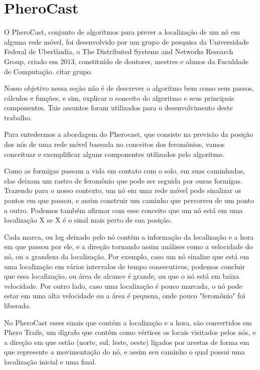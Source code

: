 \documentclass[12pt, %
openright, 
oneside,
a4paper,
brazil]{facom-ufu-abntex2}
\begin{document}
\section{PheroCast}

	O PheroCast, conjunto de algoritmos para prever a localização de um nó em alguma rede móvel, foi desenvolvido por um grupo de pesquisa da Universidade Federal de Uberlândia, o The Distributed Systems and Networks  Research Group, criado em 2013, constituído de doutores, mestres e alunos da Faculdade de Computação. citar grupo. 
	
	Nosso objetivo nessa seção não é de descrever o algoritmo bem como seus passos, cálculos e funções, e sim, explicar o conceito do algoritmo e seus principais componentes. Tais assuntos foram utilizados para o desenvolvimento deste trabalho.
	
	Para entedermos a abordagem do Pherocast, que consiste na previsão da posição dos nós de uma rede móvel baseada no conceitos dos feromônios, vamos conceituar e exemplificar alguns componentes utilizados pelo algoritmo.

	Como as formigas passam a vida em contato com o solo, em suas caminhadas, elas deixam um rastro de feromônio que pode ser seguida por ouras formigas. Trazendo para o nosso contexto, um nó em uma rede móvel pode sinalizar os pontos em que passou, e assim construir um caminho que percorreu de um ponto a outro. Podemos também afirmar com esse conceito que um nó está em uma localização X se X é o sinal mais perto de sua posição.
	
	\cite{6838650} Cada marca, ou log deixado pelo nó contém a informação da localização e a hora em que passou por ele, e a direção  tornando assim análises como a velocidade do nó, ou a grandeza da localização. Por exemplo, caso um nó sinalize que está em uma localização em vários intervalos de tempo consecutivos, podemos concluir que essa localização, ou área de alcance é grande, ou que o nó está em baixa velocidade. Por outro lado, caso uma localização é pouco marcada, o nó pode estar em uma alta velocidade ou a área é pequena, onde pouco "feromônio" foi liberado.
	
	No PheroCast esses sinais que contém a localização e a hora, são convertidos em Phero Trails, um dígrafo que contém como vértices os locais visitados pelos nós, e a direção em que estão (norte, sul, leste, oeste) ligados  por arestas de forma em que represente a movimentação do nó, e assim seu caminho o qual possui uma localização inicial e uma final.
	
\end{document}
